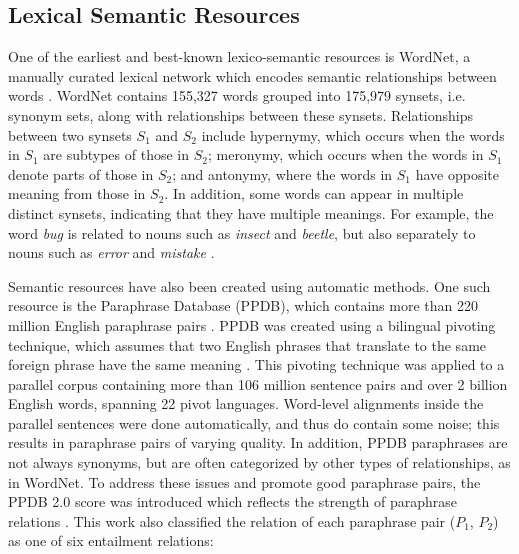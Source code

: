 \documentclass[thesis.tex]{subfiles}
\begin{document}
\subsection{Lexical Semantic Resources}

One of the earliest and best-known lexico-semantic resources is WordNet, a manually curated lexical network which encodes semantic relationships between words \citep{miller1995wordnet}. WordNet contains 155,327 words grouped into 175,979 synsets, i.e. synonym sets, along with relationships between these synsets. Relationships between two synsets $S_1$ and $S_2$ include hypernymy, which occurs when the words in $S_1$ are subtypes of those in $S_2$; meronymy, which occurs when the words in $S_1$ denote parts of those in $S_2$; and antonymy, where the words in $S_1$ have opposite meaning from those in $S_2$. In addition, some words can appear in multiple distinct synsets, indicating that they have multiple meanings. For example, the word \textit{bug} is related to nouns such as \textit{insect} and \textit{beetle}, but also separately to nouns such as \textit{error} and \textit{mistake} \citep{cocos2016clustering}.

Semantic resources have also been created using automatic methods. One such resource is the Paraphrase Database (PPDB), which contains more than 220 million English paraphrase pairs \citep{ganitkevitch2013ppdb,pavlick2015ppdb}. PPDB was created using a bilingual pivoting technique, which assumes that two English phrases that translate to the same foreign phrase have the same meaning \citep{bannard2005paraphrasing}. This pivoting technique was applied to a parallel corpus containing more than 106 million sentence pairs and over 2 billion English words, spanning 22 pivot languages. Word-level alignments inside the parallel sentences were done automatically, and thus do contain some noise; this results in paraphrase pairs of varying quality. In addition, PPDB paraphrases are not always synonyms, but are often categorized by other types of relationships, as in WordNet.
To address these issues and promote good paraphrase pairs, the PPDB 2.0 score was introduced which reflects the strength of paraphrase relations \citep{pavlick2015ppdb}. This work also classified the relation of each paraphrase pair ($P_1$, $P_2$) as one of six entailment relations: 
\end{document}
